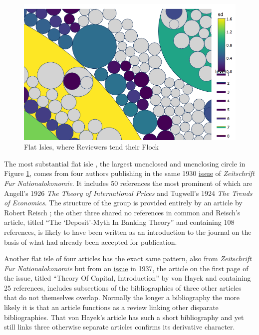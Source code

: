 \documentclass[]{book}
\theoremstyle{definition}
\theoremstyle{definition}
\theoremstyle{definition}
\theoremstyle{remark}
\begin{document}
\begin{figure}

{\centering \includegraphics[width=0.9\linewidth]{img/flat-isle} 

}

\caption{Flat Isles, where Reviewers tend their Flock}\label{fig:flat-isle}
\end{figure}

The most substantial flat isle , the largest unenclosed and unenclosing
circle in Figure \ref{fig:flat-isle}, comes from four authors publishing
in the same 1930 \href{https://www.jstor.org/stable/i40084238}{issue} of
\emph{Zeitschrift Fur Nationalokonomie}. It includes 50 references the
most prominent of which are Angell's 1926 \emph{The Theory of
International Prices} and Tugwell's 1924 \emph{The Trends of Economics}.
The structure of the group is provided entirely by an article by Robert
Reisch ; the other three shared no references in common and Reisch's
article, titled ``The `Deposit'-Myth In Banking Theory'' and containing
108 references, is likely to have been written as an introduction to the
journal on the basis of what had already been accepted for publication.

Another flat isle of four articles has the exact same pattern, also from
\emph{Zeitschrift Fur Nationalokonomie} but from an
\href{https://www.jstor.org/stable/i40084262}{issue} in 1937, the
article on the first page of the issue, titled ``Theory Of Capital,
Introduction'' by von Hayek and containing 25 references, includes
subsections of the bibliographies of three other articles that do not
themselves overlap. Normally the longer a bibliography the more likely
it is that an article functions as a review linking other disparate
bibliographies. That von Hayek's article has such a short bibliography
and yet still links three otherwise separate articles confirms its
derivative character.
\end{document}
